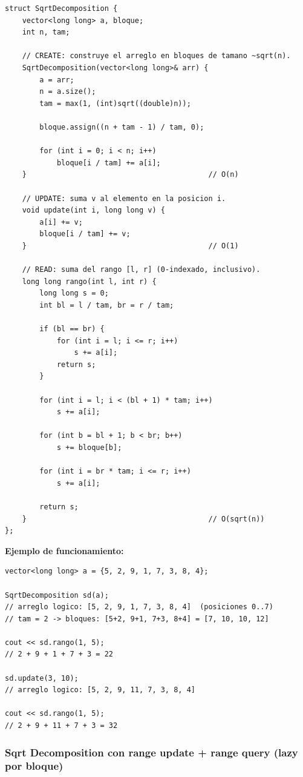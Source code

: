 \documentclass[10pt,a4paper,twocolumn]{article}
\begin{document}
\begin{lstlisting}[style=cpp]
struct SqrtDecomposition {
    vector<long long> a, bloque;
    int n, tam;

    // CREATE: construye el arreglo en bloques de tamano ~sqrt(n).
    SqrtDecomposition(vector<long long>& arr) {
        a = arr;
        n = a.size();
        tam = max(1, (int)sqrt((double)n));

        bloque.assign((n + tam - 1) / tam, 0);

        for (int i = 0; i < n; i++)
            bloque[i / tam] += a[i];
    }                                          // O(n)

    // UPDATE: suma v al elemento en la posicion i.
    void update(int i, long long v) {
        a[i] += v;
        bloque[i / tam] += v;
    }                                          // O(1)

    // READ: suma del rango [l, r] (0-indexado, inclusivo).
    long long rango(int l, int r) {
        long long s = 0;
        int bl = l / tam, br = r / tam;

        if (bl == br) {
            for (int i = l; i <= r; i++)
                s += a[i];
            return s;
        }

        for (int i = l; i < (bl + 1) * tam; i++)
            s += a[i];

        for (int b = bl + 1; b < br; b++)
            s += bloque[b];

        for (int i = br * tam; i <= r; i++)
            s += a[i];

        return s;
    }                                          // O(sqrt(n))
};
\end{lstlisting}

\textbf{Ejemplo de funcionamiento:}

\begin{lstlisting}[style=cpp]
vector<long long> a = {5, 2, 9, 1, 7, 3, 8, 4};

SqrtDecomposition sd(a);
// arreglo logico: [5, 2, 9, 1, 7, 3, 8, 4]  (posiciones 0..7)
// tam = 2 -> bloques: [5+2, 9+1, 7+3, 8+4] = [7, 10, 10, 12]

cout << sd.rango(1, 5);
// 2 + 9 + 1 + 7 + 3 = 22

sd.update(3, 10);
// arreglo logico: [5, 2, 9, 11, 7, 3, 8, 4]

cout << sd.rango(1, 5);
// 2 + 9 + 11 + 7 + 3 = 32
\end{lstlisting}


\subsubsection{Sqrt Decomposition con range update + range query (lazy por bloque)}
\end{document}
